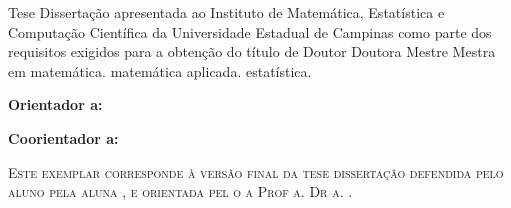 \thispagestyle{plain}


\begin{center}


\end{center}
\vfill
\begin{center}
  {\large\textbf{\textsc{\autor}}}
\end{center}
\vfill
\begin{center}
  {\Large\textbf{\textsc{\titulo}}}
\end{center}
\vfill

\begin{flushright}
  \begin{minipage}[c]{.5\textwidth}
    \ifx\mestrado\undefined
    Tese
    \else
    Dissertação
    \fi
    apresentada ao Instituto de Matemática,
    Estatística e Computação Científica da Universidade
    Estadual de Campinas como parte dos requisitos exigidos
    para a obtenção do título de
    \ifx\mestrado\undefined
    \ifx\femaleAuthor\undefined
    Doutor
    \else
    Doutora
    \fi
    \else
    \ifx\femaleAuthor\undefined
    Mestre
    \else
    Mestra
    \fi
    \fi
    em
    \ifx\matematica\undefined
    \else
    matemática.
    \fi
    \ifx\aplicada\undefined
    \else
    matemática aplicada.
    \fi
    \ifx\estatistica\undefined
    \else
    estatística.
    \fi
  \end{minipage}
\end{flushright}
\vspace{.5cm}

\noindent
\textbf{Orientador\ifx\femaleOrientador\undefined
\else
a\fi: \orientador
}
\vspace{.25cm}

\ifx\coorientador\undefined
\else
\noindent
\textbf{Coorientador\ifx\femaleCoorientador\undefined
\else
a\fi: \coorientador
}
\vspace{.5cm}
\fi

\noindent
\begin{minipage}[c]{.5\textwidth}
  {\footnotesize\textsc{Este exemplar corresponde à versão final da
  \ifx\mestrado\undefined
  tese
  \else
  dissertação
  \fi
  defendida
  \ifx\femaleAuthor\undefined
  pelo aluno
  \else
  pela aluna
  \fi
  \autor,
  e orientada pel\ifx\femaleOrientador\undefined
  o\else
  a\fi{} Prof\ifx\femaleOrientador\undefined
  \else
  a\fi. Dr\ifx\femaleOrientador\undefined
  \else
  a\fi. \orientador.
  }}
\end{minipage}
\vspace{1cm}

